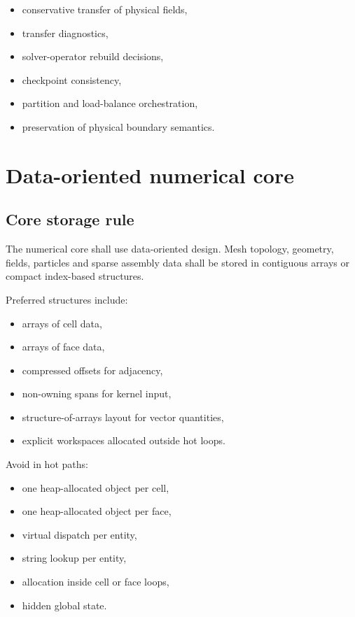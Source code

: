 \documentclass[11pt,a4paper]{article}
\begin{document}
\begin{itemize}
  \item conservative transfer of physical fields,
  \item transfer diagnostics,
  \item solver-operator rebuild decisions,
  \item checkpoint consistency,
  \item partition and load-balance orchestration,
  \item preservation of physical boundary semantics.
\end{itemize}

\section{Data-oriented numerical core}

\subsection{Core storage rule}

The numerical core shall use data-oriented design. Mesh topology, geometry, fields, particles and sparse assembly data shall be stored in contiguous arrays or compact index-based structures.

Preferred structures include:

\begin{itemize}
  \item arrays of cell data,
  \item arrays of face data,
  \item compressed offsets for adjacency,
  \item non-owning spans for kernel input,
  \item structure-of-arrays layout for vector quantities,
  \item explicit workspaces allocated outside hot loops.
\end{itemize}

Avoid in hot paths:

\begin{itemize}
  \item one heap-allocated object per cell,
  \item one heap-allocated object per face,
  \item virtual dispatch per entity,
  \item string lookup per entity,
  \item allocation inside cell or face loops,
  \item hidden global state.
\end{itemize}
\end{document}
